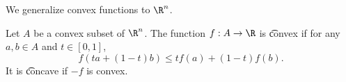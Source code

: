 
We generalize convex functions to $\R^n$.

Let $A$ be a convex subset of $\R^n$.
The function $f: A \to \R$ is \t{convex} if for any $a, b \in A$ and $t \in [0, 1]$,
  \[
f(ta + (1-t)b) \leq tf(a) + (1-t)f(b).
  \]
It is \t{concave} if $-f$ is convex.

\blankpage
